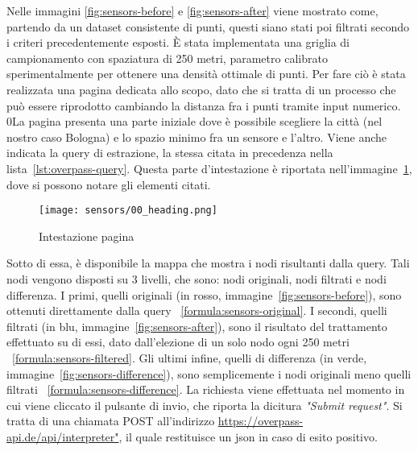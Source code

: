 Nelle immagini \ref{fig:sensors-before} e \ref{fig:sensors-after} viene mostrato come, partendo da un dataset
consistente di punti, questi siano stati poi filtrati secondo i criteri precedentemente esposti.
È stata implementata una griglia di campionamento con spaziatura di 250 metri, parametro calibrato
sperimentalmente per ottenere una densità ottimale di punti. Per fare ciò è stata realizzata una pagina dedicata
allo scopo, dato che si tratta di un processo che può essere riprodotto
cambiando la distanza fra i punti tramite input numerico.
0La pagina presenta una parte iniziale dove è possibile scegliere la città (nel nostro caso Bologna) e lo spazio
minimo fra un sensore e l'altro. Viene anche indicata la query di estrazione,
la stessa citata in precedenza nella lista~\ref{lst:overpass-query}.
Questa parte d'intestazione è riportata nell'immagine~\ref{fig:sensors-heading}, dove si possono notare gli elementi
citati.

\begin{figure}[H]
  \centering
  \texttt{[image: sensors/00\_heading.png]}
  \caption{Intestazione pagina}
  \label{fig:sensors-heading}
\end{figure}

Sotto di essa, è disponibile la mappa che mostra i nodi risultanti dalla query.
Tali nodi vengono disposti su 3 livelli, che sono: nodi originali, nodi filtrati e nodi differenza.
I primi, quelli originali (in rosso, immagine~\ref{fig:sensors-before}),
sono ottenuti direttamente dalla query ~\ref{formula:sensors-original}.
I secondi, quelli filtrati (in blu, immagine~\ref{fig:sensors-after}), sono il risultato del trattamento effettuato
su di essi, dato dall'elezione di un solo nodo ogni 250 metri ~\ref{formula:sensors-filtered}.
Gli ultimi infine, quelli di differenza (in verde, immagine~\ref{fig:sensors-difference}),
sono semplicemente i nodi originali
meno quelli filtrati ~\ref{formula:sensors-difference}.
La richiesta viene effettuata nel momento in cui viene cliccato il pulsante di invio, che riporta la
dicitura \textit{"Submit request"}. Si tratta di una chiamata POST
all'indirizzo \url{https://overpass-api.de/api/interpreter"}, il quale restituisce un \acrshort{json} in caso di
esito positivo.


